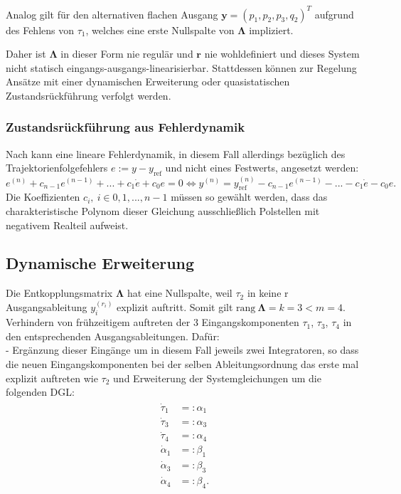 Analog gilt für den alternativen flachen Ausgang $\mathbf{y} = (p_1, p_2, p_3, q_2)^T$ aufgrund des Fehlens von $\tau_1$, welches eine erste Nullspalte von $\mathbf{\Lambda}$ impliziert.

Daher ist $\mathbf{\Lambda}$ in dieser Form nie regulär und $\mathbf{r}$ nie wohldefiniert und dieses System nicht statisch eingangs-ausgangs-linearisierbar. 
Stattdessen können zur Regelung Ansätze mit einer dynamischen Erweiterung oder quasistatischen Zustandsrückführung verfolgt werden. 

\subsubsection{Zustandsrückführung aus Fehlerdynamik}
Nach \cite[S. 195]{NLRT_Roebenack} kann eine lineare Fehlerdynamik, in diesem Fall allerdings bezüglich des Trajektorienfolgefehlers $e := y - y_{\text{ref}}$ und nicht eines Festwerts, angesetzt werden:
\begin{equation}
	e^{(n)} + c_{n-1} e^{(n-1)} + ... + c_{1} \dot{e} + c_{0} e = 0 
	\Leftrightarrow y^{(n)} = y_{\text{ref}}^{(n)} - c_{n-1} e^{(n-1)} - ... - c_{1} \dot{e} - c_{0} e .
\end{equation}
Die Koeffizienten $c_i, \ i \in {0, 1, ..., n-1}$ müssen so gewählt werden, dass das charakteristische Polynom dieser Gleichung ausschließlich Polstellen mit negativem Realteil aufweist.

\subsection{Dynamische Erweiterung}
Die Entkopplungsmatrix $\mathbf{\Lambda}$ hat eine Nullspalte, weil $\tau_2$ in keine r Ausgangsableitung $y_i^{(r_i)}$ explizit auftritt. Somit gilt $\text{rang} \ \mathbf{\Lambda} = k = 3 < m = 4$. \\

Verhindern von frühzeitigem auftreten der 3 Eingangskomponenten $\tau_1$, $\tau_3$, $\tau_4$ in den entsprechenden Ausgangsableitungen. Dafür: \\
- Ergänzung dieser Eingänge um  in diesem Fall jeweils zwei Integratoren, so dass die neuen Eingangskomponenten bei der selben Ableitungsordnung das erste mal explizit auftreten wie $\tau_2$ und Erweiterung der Systemgleichungen um die folgenden DGL:
\begin{align}
	\begin{split}
		\dot{\tau}_1 &=: \alpha_1 \\
		\dot{\tau}_3 &=: \alpha_3 \\
		\dot{\tau}_4 &=: \alpha_4 \\
		\dot{\alpha}_1 &=: \beta_1 \\
		\dot{\alpha}_3 &=: \beta_3 \\
		\dot{\alpha}_4 &=: \beta_4 .
	\end{split}
\end{align}

